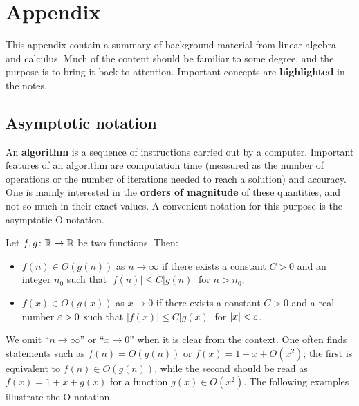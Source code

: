 \newtheorem*{theorem*}{Theorem}
\renewcommand{\thesection}{\arabic{section}}

\renewcommand\thefigure{\thesection.\arabic{figure}}

\renewcommand{\marginpar}[2][]{}

\chapter*{Appendix}
This appendix contain a summary of background material from linear algebra and calculus. Much of the content should be familiar to some degree, and the purpose is to bring it back to attention. Important concepts are \textbf{highlighted} in the notes.

\section{Asymptotic notation}
An \marginpar{\textbf{algorithm}}\textbf{algorithm} is a sequence of instructions carried out by a computer. Important features of an algorithm are computation time (measured as the number of operations or the number of iterations needed to reach a solution) and accuracy. 
One is mainly interested in the \marginpar{\textbf{orders of magnitude}}\textbf{orders of magnitude} of these quantities, and not so much in their exact values. A convenient notation for this purpose is the asymptotic O-notation.

Let $f,g\colon \mathbb{R}\to \mathbb{R}$ be two functions. Then:
\begin{itemize}
 \item $f(n)\in O(g(n))$ as $n\to \infty$ if there exists a constant $C>0$ and an integer $n_0$ such that $|f(n)|\leq C |g(n)|$ for $n>n_0$;\marginpar{$O(g(n))$, $O(g(x))$}
 \item $f(x)\in O(g(x))$ as $x\to 0$ if there exists a constant $C>0$ and a real number $\varepsilon>0$ such that $|f(x)|\leq C|g(x)|$ for $|x|<\varepsilon$.
\end{itemize}

We omit ``$n\to \infty$'' or ``$x\to 0$'' when it is clear from the context. One often finds statements such as $f(n)=O(g(n))$ or $f(x) = 1+x+O(x^2)$; the first is equivalent to $f(n)\in O(g(n))$, while the second should be read as $f(x) = 1+x+g(x)$ for a function $g(x)\in O(x^2)$.
The following examples illustrate the O-notation.

